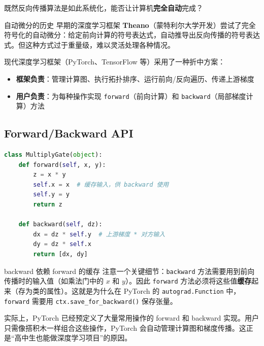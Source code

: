 \documentclass[a4paper]{article}
\begin{document}
既然反向传播算法是如此系统化，能否让计算机\textbf{完全自动}完成？

\begin{knowledgebox}{自动微分的历史}
早期的深度学习框架 \textbf{Theano}（蒙特利尔大学开发）尝试了完全符号化的自动微分：给定前向计算的符号表达式，自动推导出反向传播的符号表达式。但这种方式过于重量级，难以灵活处理各种情况。
\end{knowledgebox}

现代深度学习框架（PyTorch、TensorFlow 等）采用了一种折中方案：

\begin{itemize}
    \item \textbf{框架负责}：管理计算图、执行拓扑排序、运行前向/反向遍历、传递上游梯度
    \item \textbf{用户负责}：为每种操作实现 \texttt{forward}（前向计算）和 \texttt{backward}（局部梯度计算）方法
\end{itemize}

\subsection{Forward/Backward API}





\begin{lstlisting}[caption={乘法门的 Forward/Backward 实现},language=Python]
class MultiplyGate(object):
    def forward(self, x, y):
        z = x * y
        self.x = x  # 缓存输入，供 backward 使用
        self.y = y
        return z

    def backward(self, dz):
        dx = dz * self.y  # 上游梯度 * 对方输入
        dy = dz * self.x
        return [dx, dy]
\end{lstlisting}

\begin{warningbox}{backward 依赖 forward 的缓存}
注意一个关键细节：\texttt{backward} 方法需要用到前向传播时的输入值（如乘法门中的 $x$ 和 $y$）。因此 \texttt{forward} 方法必须将这些值\textbf{缓存}起来（存为类的属性）。这就是为什么在 PyTorch 的 \texttt{autograd.Function} 中，\texttt{forward} 需要用 \texttt{ctx.save\_for\_backward()} 保存张量。
\end{warningbox}

实际上，PyTorch 已经预定义了大量常用操作的 forward 和 backward 实现。用户只需像搭积木一样组合这些操作，PyTorch 会自动管理计算图和梯度传播。这正是``高中生也能做深度学习项目''的原因。
\end{document}
